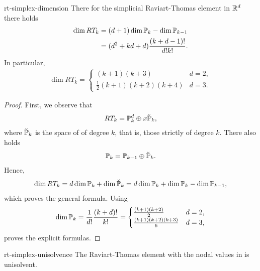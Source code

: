 \begin{Lemma}{rt-simplex-dimension}
  There for the simplicial Raviart-Thomas element in $\R^d$ there
  holds
  \begin{gather}
    \label{eq:darcy:25}
    \begin{split}
      \dim RT_k &= (d+1)\dim\P_k - \dim \P_{k-1}
      \\
      &= (d^2+k d+d)\frac{(k+d-1)!}{d!k!}.
    \end{split}
  \end{gather}
  In particular,
  \begin{gather}
    \label{eq:darcy:23}
    \dim RT_k =
    \begin{cases}
      (k+1)(k+3) & d=2,
      \\
      \tfrac12 (k+1)(k+2)(k+4) & d=3.
    \end{cases}
  \end{gather}
\end{Lemma}

\begin{proof}
  First, we observe that
  \begin{gather*}
    RT_k = \P_k^d \oplus x\breve\P_k,
  \end{gather*}
  where $\breve \P_k$ is the space of  of degree $k$, that is, those strictly of degree
  $k$. There also holds
  \begin{gather*}
    \P_{k} = \P_{k-1} \oplus \breve \P_k.
  \end{gather*}
  Hence,
  \begin{gather*}
    \dim RT_k = d \dim \P_k + \dim\breve\P_k = d \dim \P_k + \dim \P_k
    - \dim \P_{k-1},
  \end{gather*}
  which proves the general formula. Using
  \begin{gather}
    \dim\P_k
    =\frac1{d!} \frac{(k+d)!}{k!}
    =
    \begin{cases}
      \frac{(k+1)(k+2)}{2} & d=2,\\
      \frac{(k+1)(k+2)(k+3)}{6} & d=3,
    \end{cases}
  \end{gather}
  proves the explicit formulas.
\end{proof}

\begin{Lemma}{rt-simplex-unisolvence}
  The Raviart-Thomas element with the nodal values in
   is unisolvent.
\end{Lemma}


